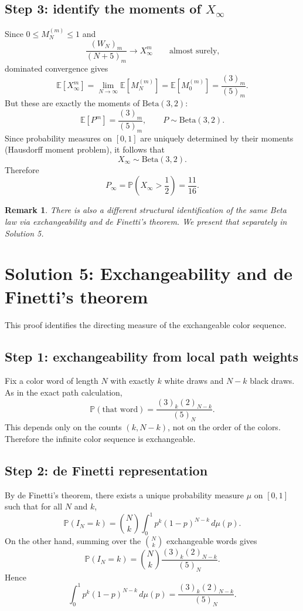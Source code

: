\documentclass[12pt]{article}
\newtheorem{remark}{Remark}
\begin{document}
\subsection*{Step 3: identify the moments of $X_\infty$}
Since $0\le M_N^{(m)}\le 1$ and
\[
\frac{(W_N)_m}{(N+5)_m}\longrightarrow X_\infty^m
\qquad\text{almost surely,}
\]
dominated convergence gives
\[
\mathbb{E}[X_\infty^m]
=
\lim_{N\to\infty}\mathbb{E}[M_N^{(m)}]
=
\mathbb{E}[M_0^{(m)}]
=
\frac{(3)_m}{(5)_m}.
\]
But these are exactly the moments of $\mathrm{Beta}(3,2)$:
\[
\mathbb{E}[P^m]=\frac{(3)_m}{(5)_m},
\qquad P\sim \mathrm{Beta}(3,2).
\]
Since probability measures on $[0,1]$ are uniquely determined by their moments (Hausdorff moment problem), it follows that
\[
X_\infty\sim \mathrm{Beta}(3,2).
\]
Therefore
\[
P_\infty=\mathbb{P}\!\left(X_\infty>\frac12\right)=\frac{11}{16}.
\]

\begin{remark}
There is also a different structural identification of the same Beta law via exchangeability and de Finetti's theorem. We present that separately in Solution 5.
\end{remark}

\section{Solution 5: Exchangeability and de Finetti's theorem}

This proof identifies the directing measure of the exchangeable color sequence.

\subsection*{Step 1: exchangeability from local path weights}
Fix a color word of length $N$ with exactly $k$ white draws and $N-k$ black draws. As in the exact path calculation,
\[
\mathbb{P}(\text{that word})
=
\frac{(3)_k(2)_{N-k}}{(5)_N}.
\]
This depends only on the counts $(k,N-k)$, not on the order of the colors. Therefore the infinite color sequence is exchangeable.

\subsection*{Step 2: de Finetti representation}
By de Finetti's theorem, there exists a unique probability measure $\mu$ on $[0,1]$ such that for all $N$ and $k$,
\[
\mathbb{P}(I_N=k)
=
\binom{N}{k}\int_0^1 p^k(1-p)^{N-k}\,d\mu(p).
\]
On the other hand, summing over the $\binom{N}{k}$ exchangeable words gives
\[
\mathbb{P}(I_N=k)
=
\binom{N}{k}\frac{(3)_k(2)_{N-k}}{(5)_N}.
\]
Hence
\[
\int_0^1 p^k(1-p)^{N-k}\,d\mu(p)
=
\frac{(3)_k(2)_{N-k}}{(5)_N}.
\]
\end{document}
